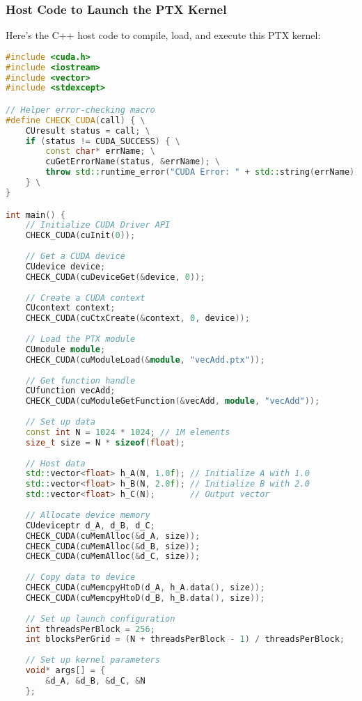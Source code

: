 \subsubsection{Host Code to Launch the PTX Kernel}

Here's the C++ host code to compile, load, and execute this PTX kernel:

\begin{lstlisting}[language=C++]
#include <cuda.h>
#include <iostream>
#include <vector>
#include <stdexcept>

// Helper error-checking macro
#define CHECK_CUDA(call) { \
    CUresult status = call; \
    if (status != CUDA_SUCCESS) { \
        const char* errName; \
        cuGetErrorName(status, &errName); \
        throw std::runtime_error("CUDA Error: " + std::string(errName)); \
    } \
}

int main() {
    // Initialize CUDA Driver API
    CHECK_CUDA(cuInit(0));
    
    // Get a CUDA device
    CUdevice device;
    CHECK_CUDA(cuDeviceGet(&device, 0));
    
    // Create a CUDA context
    CUcontext context;
    CHECK_CUDA(cuCtxCreate(&context, 0, device));
    
    // Load the PTX module
    CUmodule module;
    CHECK_CUDA(cuModuleLoad(&module, "vecAdd.ptx"));
    
    // Get function handle
    CUfunction vecAdd;
    CHECK_CUDA(cuModuleGetFunction(&vecAdd, module, "vecAdd"));
    
    // Set up data
    const int N = 1024 * 1024; // 1M elements
    size_t size = N * sizeof(float);
    
    // Host data
    std::vector<float> h_A(N, 1.0f); // Initialize A with 1.0
    std::vector<float> h_B(N, 2.0f); // Initialize B with 2.0
    std::vector<float> h_C(N);       // Output vector
    
    // Allocate device memory
    CUdeviceptr d_A, d_B, d_C;
    CHECK_CUDA(cuMemAlloc(&d_A, size));
    CHECK_CUDA(cuMemAlloc(&d_B, size));
    CHECK_CUDA(cuMemAlloc(&d_C, size));
    
    // Copy data to device
    CHECK_CUDA(cuMemcpyHtoD(d_A, h_A.data(), size));
    CHECK_CUDA(cuMemcpyHtoD(d_B, h_B.data(), size));
    
    // Set up launch configuration
    int threadsPerBlock = 256;
    int blocksPerGrid = (N + threadsPerBlock - 1) / threadsPerBlock;
    
    // Set up kernel parameters
    void* args[] = {
        &d_A, &d_B, &d_C, &N
    };
    

\end{lstlisting}
